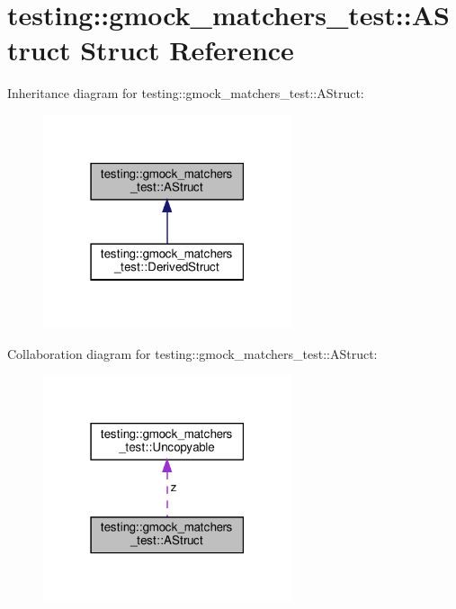 \hypertarget{structtesting_1_1gmock__matchers__test_1_1_a_struct}{}\section{testing\+:\+:gmock\+\_\+matchers\+\_\+test\+:\+:A\+Struct Struct Reference}
\label{structtesting_1_1gmock__matchers__test_1_1_a_struct}


Inheritance diagram for testing\+:\+:gmock\+\_\+matchers\+\_\+test\+:\+:A\+Struct\+:
\nopagebreak
\begin{figure}[H]
\begin{center}
\leavevmode
\includegraphics[width=207pt]{structtesting_1_1gmock__matchers__test_1_1_a_struct__inherit__graph}
\end{center}
\end{figure}


Collaboration diagram for testing\+:\+:gmock\+\_\+matchers\+\_\+test\+:\+:A\+Struct\+:
\nopagebreak
\begin{figure}[H]
\begin{center}
\leavevmode
\includegraphics[width=207pt]{structtesting_1_1gmock__matchers__test_1_1_a_struct__coll__graph}
\end{center}
\end{figure}
